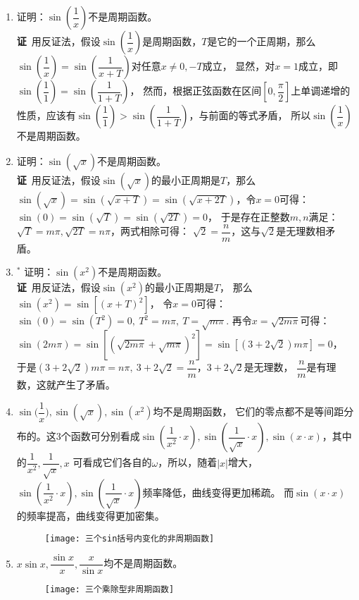\begin{enumerate}[label={【\textbf{例\thechapter.\arabic*}】},
 leftmargin=\inteval{\myenumleftmargin}pt,
 itemsep=\inteval{\myenumitempsep}pt,
 itemindent=\inteval{\myenumitemindent}pt]
\item 证明：$ \sin\left( \dfrac{1}{x}\right)  $不是周期函数。\\
\textbf{证}\ 用反证法，假设$ \sin\left( \dfrac{1}{x}\right)  $是周期函数，$ T $是它的一个正周期，那么
$ \sin\left( \dfrac{1}{x}\right)= \sin\left( \dfrac{1}{x+T}\right) $对任意$ x\neq 0,-T $成立，
显然，对$ x=1 $成立，即$ \sin\left( \dfrac{1}{1}\right)= \sin\left( \dfrac{1}{1+T}\right) $，
然而，根据正弦函数在区间$ [0,\dfrac{\pi}{2}] $上单调递增的性质，应该有$ \sin\left( \dfrac{1}{1}\right)> 
\sin\left( \dfrac{1}{1+T}\right) $，与前面的等式矛盾，
所以$ \sin\left( \dfrac{1}{x}\right)  $不是周期函数。

\item 证明：$ \sin(\sqrt{x})$不是周期函数。 \\
\textbf{证}\ 用反证法，假设$ \sin(\sqrt{x}) $的最小正周期是$ T $，那么$ \sin(\sqrt{x})=
\sin(\sqrt{x+T})=\sin(\sqrt{x+2T}) $，令$ x=0 $可得：
$ \sin(0)=\sin(\sqrt{T})=\sin(\sqrt{2T})=0 $，
于是存在正整数$ m,n $满足：$ \sqrt{T}=m\pi,\sqrt{2T}=n\pi $，两式相除可得：
$ \sqrt{2}=\dfrac{n}{m} $，这与$ \sqrt{2} $是无理数相矛盾。

\item $ ^* $ 证明：$ \sin(x^2) $不是周期函数。\\
\textbf{证}\ 用反证法，假设$ \sin(x^2) $的最小正周期是$ T $，
那么$ \sin(x^2)=\sin\left[(x+T)^2\right] $，
令$ x=0 $可得：$ \sin(0)=\sin(T^2)=0,\ T^2=m\pi,\ T=\sqrt{m\pi} $. 
再令$ x=\sqrt{2m\pi} $可得：$ \sin(2m\pi)=\sin\left[(
\sqrt{2m\pi}+\sqrt{m\pi})^2\right]=\sin\left[(3+2\sqrt{2})m\pi\right]=0 $，
于是$ (3+2\sqrt{2})m\pi=n\pi,\ 3+2\sqrt{2}=\dfrac{n}{m} $，$ 3+2\sqrt{2} $是无理数，
$ \dfrac{n}{m} $是有理数，这就产生了矛盾。

\item $ \sin\Big(\dfrac{1}{x}\Big),\sin(\sqrt{x}),\sin(x^2)$均不是周期函数，
它们的零点都不是等间距分布的。这3个函数可分别看成$\sin\left(\dfrac{1}{x^2}
\cdot x\right),\sin\left(\dfrac{1}{\sqrt{x}}\cdot x\right), 
\sin\left(x\cdot x\right)$，其中的$ \dfrac{1}{x^2},\dfrac{1}{\sqrt{x}},x $
可看成它们各自的$ \omega $，所以，随着$ |x| $增大，
$\sin\left(\dfrac{1}{x^2} \cdot x\right), 
\sin\left(\dfrac{1}{\sqrt{x}}\cdot x\right)$频率降低，曲线变得更加稀疏。
而$ \sin(x\cdot x) $的频率提高，曲线变得更加密集。
\begin{figure}[h]
    \centering
    \texttt{[image: 三个sin括号内变化的非周期函数]}
\end{figure} 

\item $ x\sin x,\dfrac{\sin x}{x},\dfrac{x}{\sin x} $均不是周期函数。 \\
\begin{figure}[h]
    \centering
    \texttt{[image: 三个乘除型非周期函数]}
\end{figure}


\end{enumerate}
